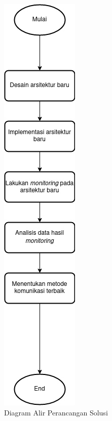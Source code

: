 \begin{figure}[ht]
	\begin{center}
		\includegraphics[height=0.6\textheight]{resources/chapter-3/flowchart-perancangan.png}
		\caption{Diagram Alir Perancangan Solusi}
		\label{chapter-3-perancangan}
	\end{center}
\end{figure}